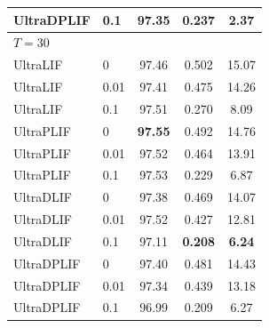 \documentclass{article}
\theoremstyle{plain}
\theoremstyle{definition}
\theoremstyle{remark}
\begin{document}
\begin{table}[h]
\begin{center}
\begin{small}
\begin{tabular}{llccc}
UltraDPLIF & 0.1  & 97.35 & \textbf{0.237} & \textbf{2.37} \\
\midrule
\multicolumn{5}{l}{\textit{$T{=}30$}} \\
UltraLIF   & 0    & 97.46 & 0.502 & 15.07 \\
UltraLIF   & 0.01 & 97.41 & 0.475 & 14.26 \\
UltraLIF   & 0.1  & 97.51 & 0.270 & 8.09 \\
UltraPLIF  & 0    & \textbf{97.55} & 0.492 & 14.76 \\
UltraPLIF  & 0.01 & 97.52 & 0.464 & 13.91 \\
UltraPLIF  & 0.1  & 97.53 & 0.229 & 6.87 \\
UltraDLIF  & 0    & 97.38 & 0.469 & 14.07 \\
UltraDLIF  & 0.01 & 97.52 & 0.427 & 12.81 \\
UltraDLIF  & 0.1  & 97.11 & \textbf{0.208} & \textbf{6.24} \\
UltraDPLIF & 0    & 97.40 & 0.481 & 14.43 \\
UltraDPLIF & 0.01 & 97.34 & 0.439 & 13.18 \\
UltraDPLIF & 0.1  & 96.99 & 0.209 & 6.27 \\
\bottomrule
\end{tabular}
\end{small}
\end{center}
\vskip -0.1in
\end{table}
\end{document}
